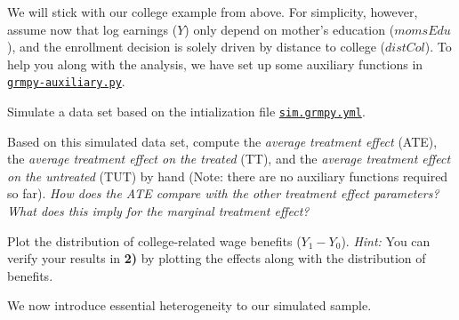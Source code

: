    We will stick with our college example from above. For simplicity, however, assume now that log earnings ($Y$) only depend on mother's education ($momsEdu$), and the enrollment decision is solely driven by distance to college ($distCol$). To help you along with the analysis, we have set up some auxiliary functions in  \href{https://github.com/HumanCapitalAnalysis/microeconometrics/tree/peisenha_integration_problem_set/problem-sets/01-potential-outcome-model/data}{\texttt{grmpy-auxiliary.py}}.


\begin{boenumerate}
  \item Simulate a data set based on the intialization file \href{https://github.com/HumanCapitalAnalysis/microeconometrics/tree/peisenha_integration_problem_set/problem-sets/01-potential-outcome-model/data}{\texttt{sim.grmpy.yml}}. 
  
  \item Based on this simulated data set, compute the \emph{average treatment effect} (ATE), the \emph{average treatment effect on the treated} (TT), and the \emph{average treatment effect on the untreated} (TUT) by hand (Note: there are no auxiliary functions required so far). \emph{How does the ATE compare with the other treatment effect parameters?} \emph{What does this imply for the marginal treatment effect?}
  
  \item Plot the distribution of college-related wage benefits ($Y_1 - Y_0$). \textit{Hint:} You can verify your results in \textbf{2)} by plotting the effects along with the distribution of benefits.
  
\end{boenumerate}

  \noindent We now introduce essential heterogeneity to our simulated sample.

